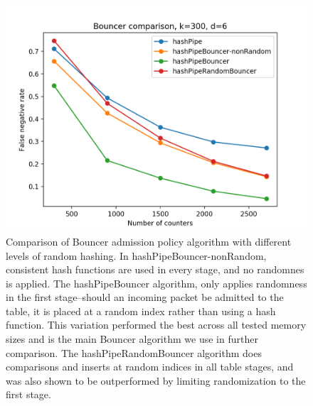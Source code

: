 \begin{figure}[t]
  \centering
    \includegraphics[scale=0.5]{bouncer}
     \caption{Comparison of Bouncer admission policy algorithm with different levels of random hashing. In hashPipeBouncer-nonRandom, consistent hash functions are used in every stage, and no randomnes is applied. The hashPipeBouncer algorithm, only applies randomness in the first stage--should an incoming packet be admitted to the table, it is placed at a random index rather than using a hash function. This variation performed the best across all tested memory sizes and is the main Bouncer algorithm we use in further comparison. The hashPipeRandomBouncer algorithm does comparisons and inserts at random indices in all table stages, and was also shown to be outperformed by limiting randomization to the first stage.}
     \label{fig:bp-image}
\end{figure}

